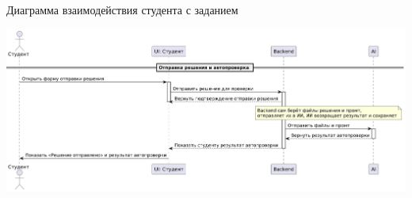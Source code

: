 \documentclass[aspectratio=169]{beamer}
\begin{document}
\begin{frame}{Диаграмма взаимодействия студента с заданием}
\vspace{0.5em}

\centering
\includegraphics[width=0.75\linewidth]{static/TaskSendStudentDiagram.png} \\
\end{frame}

%
\end{document}
